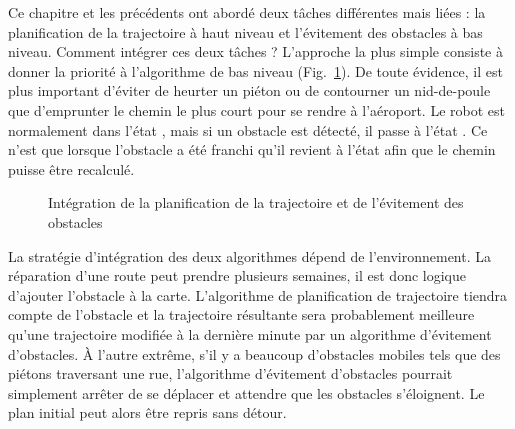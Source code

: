Ce chapitre et les précédents ont abordé deux tâches différentes mais liées : la planification de la trajectoire à haut niveau et l'évitement des obstacles à bas niveau. Comment intégrer ces deux tâches ? L'approche la plus simple consiste à donner la priorité à l'algorithme de bas niveau (Fig.~\ref{fig.integrate-pp}). De toute évidence, il est plus important d'éviter de heurter un piéton ou de contourner un nid-de-poule que d'emprunter le chemin le plus court pour se rendre à l'aéroport. Le robot est normalement dans l'état , mais si un obstacle est détecté, il passe à l'état . Ce n'est que lorsque l'obstacle a été franchi qu'il revient à l'état  afin que le chemin puisse être recalculé.

\begin{figure}
\begin{center}
\caption{Intégration de la planification de la trajectoire et de l'évitement des obstacles}
\label{fig.integrate-pp}
\end{center}
\end{figure}

La stratégie d'intégration des deux algorithmes dépend de l'environnement. La réparation d'une route peut prendre plusieurs semaines, il est donc logique d'ajouter l'obstacle à la carte. L'algorithme de planification de trajectoire tiendra compte de l'obstacle et la trajectoire résultante sera probablement meilleure qu'une trajectoire modifiée à la dernière minute par un algorithme d'évitement d'obstacles. À l'autre extrême, s'il y a beaucoup d'obstacles mobiles tels que des piétons traversant une rue, l'algorithme d'évitement d'obstacles pourrait simplement arrêter de se déplacer et attendre que les obstacles s'éloignent. Le plan initial peut alors être repris sans détour.

